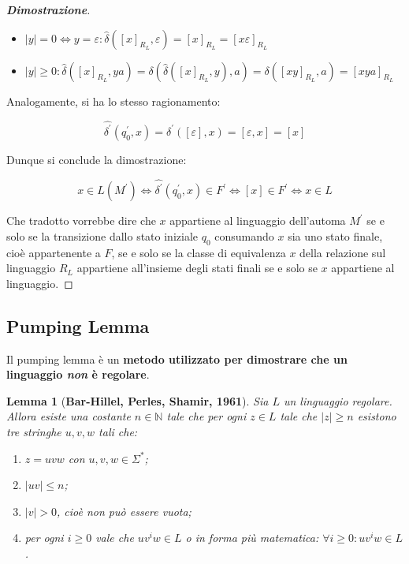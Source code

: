 \documentclass[a4paper]{article}
\newtheorem{lemma}{Lemma}
\begin{document}
\begin{proof}[\textbf{Dimostrazione}]
		\begin{itemize}
			\item $|y| = 0 \iff y = \varepsilon : \hat{\delta} \left(\left[x\right]_{R_{L}}, \varepsilon\right) = \left[x\right]_{R_{L}} = \left[x\varepsilon\right]_{R_{L}}$
			
			\item $|y| \ge 0 : \hat{\delta}\left(\left[x\right]_{R_{L}}, ya\right) = \delta\left(\hat{\delta}\left(\left[x\right]_{R_{L}}, y\right), a\right) = \delta\left(\left[xy\right]_{R_{L}}, a\right) = \left[xya\right]_{R_{L}}$
		\end{itemize}
		
		\noindent
		Analogamente, si ha lo stesso ragionamento:
		
		\begin{equation*}
			\hat{\delta^{'}}\left(q_{0}^{'}, x\right) = \hat{\delta^{'}}\left(\left[\varepsilon\right], x\right) = \left[\varepsilon, x\right] = \left[x\right]
		\end{equation*}
		
		\noindent
		Dunque si conclude la dimostrazione:
		
		\begin{equation*}
			x \in L\left(M^{'}\right) \iff \hat{\delta^{'}}\left(q_{0}^{'}, x\right) \in F^{'} \iff \left[x\right] \in F^{'} \iff x \in L
		\end{equation*}
		
		\noindent
		Che tradotto vorrebbe dire che $x$ appartiene al linguaggio dell'automa $M^{'}$ se e solo se la transizione dallo stato iniziale $q_{0}$ consumando $x$ sia uno stato finale, cioè appartenente a $F$, se e solo se la classe di equivalenza $x$ della relazione sul linguaggio $R_{L}$ appartiene all'insieme degli stati finali se e solo se $x$ appartiene al linguaggio.
	\end{proof}

	\newpage
	
	\subsection{Pumping Lemma}
	
	Il pumping lemma è un \textbf{metodo utilizzato per dimostrare che un linguaggio \emph{non} è regolare}.
	
	\begin{lemma}[\textbf{Bar-Hillel, Perles, Shamir, 1961}]
		Sia $L$ un linguaggio regolare. Allora esiste una costante $n \in \mathbb{N}$ tale che per ogni $z \in L$ tale che $|z| \ge n$ esistono tre stringhe $u, v, w$ tali che:
		
		\begin{enumerate}
			\item $z = uvw$ con $u,v,w \in \Sigma^{*}$;
			\item $|uv| \le n$;
			\item $|v| > 0$, cioè non può essere vuota;
			\item per ogni $i \ge 0$ vale che $u v^{i} w \in L$ o in forma più matematica: $\forall i \ge 0: uv^{i}w \in L$.
		\end{enumerate}
	\end{lemma}
\end{document}
